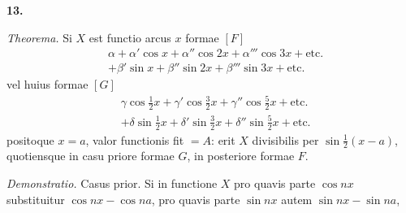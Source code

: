 \documentclass[12pt,a4paper]{article}
\begin{document}
\smallskip\noindent
\textbf{13.}

\smallskip\noindent
\textit{Theorema.} Si $X$ est functio arcus $x$ formae $[F]$
\begin{align*}
&\alpha + \alpha'\cos x + \alpha''\cos 2x + \alpha'''\cos 3x + \text{etc.}\\
&+ \beta'\sin x + \beta''\sin 2x + \beta'''\sin 3x + \text{etc.}
\end{align*}
vel huius formae $[G]$
\begin{align*}
&\gamma\cos\tfrac{1}{2}x + \gamma'\cos\tfrac{3}{2}x + \gamma''\cos\tfrac{5}{2}x + \text{etc.}\\
&+ \delta\sin\tfrac{1}{2}x + \delta'\sin\tfrac{3}{2}x + \delta''\sin\tfrac{5}{2}x + \text{etc.}
\end{align*}
positoque $x=a$, valor functionis fit $=A$: erit $X$ divisibilis per $\sin\tfrac{1}{2}(x-a)$,
quotiensque in casu priore formae $G$, in posteriore formae $F$.

\smallskip\noindent
\textit{Demonstratio.} Casus prior. Si in functione $X$ pro quavis parte $\cos nx$
substituitur $\cos nx - \cos na$, pro quavis parte $\sin nx$ autem $\sin nx - \sin na$,
\end{document}
